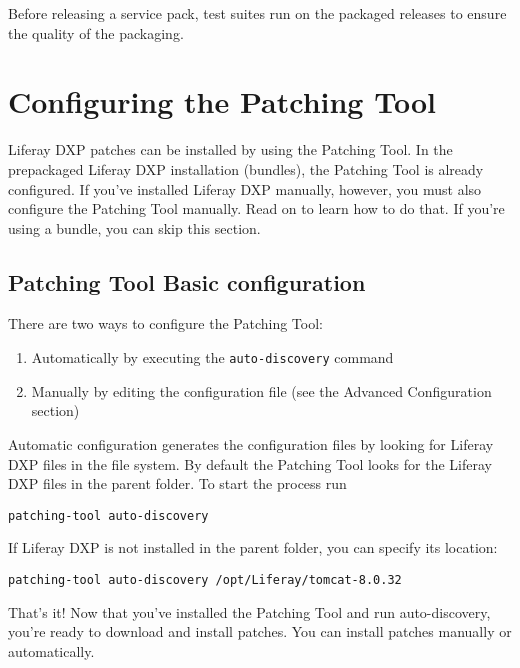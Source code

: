 Before releasing a service pack, test suites run on the packaged
releases to ensure the quality of the packaging.

\chapter{Configuring the Patching
Tool}\label{configuring-the-patching-tool}

Liferay DXP patches can be installed by using the Patching Tool. In the
prepackaged Liferay DXP installation (bundles), the Patching Tool is
already configured. If you've installed Liferay DXP manually, however,
you must also configure the Patching Tool manually. Read on to learn how
to do that. If you're using a bundle, you can skip this section.

\section{Patching Tool Basic
configuration}\label{patching-tool-basic-configuration}

There are two ways to configure the Patching Tool:

\begin{enumerate}
\def\labelenumi{\arabic{enumi}.}
\item
  Automatically by executing the \texttt{auto-discovery} command
\item
  Manually by editing the configuration file (see the Advanced
  Configuration section)
\end{enumerate}

Automatic configuration generates the configuration files by looking for
Liferay DXP files in the file system. By default the Patching Tool looks
for the Liferay DXP files in the parent folder. To start the process run

\begin{verbatim}
patching-tool auto-discovery
\end{verbatim}

If Liferay DXP is not installed in the parent folder, you can specify
its location:

\begin{verbatim}
patching-tool auto-discovery /opt/Liferay/tomcat-8.0.32
\end{verbatim}

That's it! Now that you've installed the Patching Tool and run
auto-discovery, you're ready to download and install patches. You can
install patches manually or automatically.

